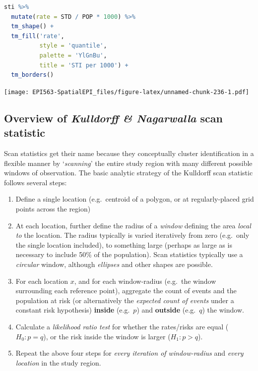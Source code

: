 \documentclass[
]{book}
\providecommand{\tightlist}{%
  \setlength{\itemsep}{0pt}\setlength{\parskip}{0pt}}
\begin{document}
\begin{lstlisting}[language=R]
sti %>%
  mutate(rate = STD / POP * 1000) %>%
  tm_shape() + 
  tm_fill('rate',
          style = 'quantile',
          palette = 'YlGnBu',
          title = 'STI per 1000') +
  tm_borders()
\end{lstlisting}

\texttt{[image: EPI563-SpatialEPI\_files/figure-latex/unnamed-chunk-236-1.pdf]}

\hypertarget{overview-of-kulldorff-nagarwalla-scan-statistic}{%
\subsection{\texorpdfstring{Overview of \emph{Kulldorff \& Nagarwalla} scan statistic}{Overview of Kulldorff \& Nagarwalla scan statistic}}\label{overview-of-kulldorff-nagarwalla-scan-statistic}}

Scan statistics get their name because they conceptually cluster identification in a flexible manner by `\emph{scanning}' the entire study region with many different possible windows of observation. The basic analytic strategy of the Kulldorff scan statistic follows several steps:

\begin{enumerate}
\def\labelenumi{\arabic{enumi}.}
\tightlist
\item
  Define a single location (e.g.~centroid of a polygon, or at regularly-placed grid points across the region)
\item
  At each location, further define the radius of a \emph{window} defining the area \emph{local to} the location. The radius typically is varied iteratively from zero (e.g.~only the single location included), to something large (perhaps as large as is necessary to include 50\% of the population). Scan statistics typically use a \emph{circular} window, although \emph{ellipses} and other shapes are possible.
\item
  For each location \(x\), and for each window-radius (e.g.~the window surrounding each reference point), aggregate the count of events and the population at risk (or alternatively the \emph{expected count of events} under a constant risk hypothesis) \textbf{inside} (e.g.~\(p\)) and \textbf{outside} (e.g.~\(q\)) the window.
\item
  Calculate a \emph{likelihood ratio test} for whether the rates/risks are equal (\(H_0: p=q\)), or the risk inside the window is larger (\(H_1: p>q\)).
\item
  Repeat the above four steps for \emph{every iteration of window-radius} and \emph{every location} in the study region.
\end{enumerate}
\end{document}
